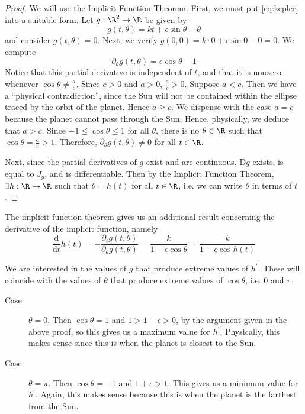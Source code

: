 \documentclass[letterpaper,11pt]{article}
\newcommand{\D}{\mathrm{D}}
\renewcommand{\d}[2]{\frac{\mathrm{d}#1}{\mathrm{d}#2}}
\newcommand{\dd}[1]{\d{}{#1}}
\begin{document}
\begin{proof}
  We will use the Implicit Function Theorem. First, we must put
  \eqref{eq:kepler} into a suitable form. Let $g : \R^2 \to \R$ be given by
  \begin{equation*}
    g(t, \theta) = kt + \epsilon \sin \theta - \theta
  \end{equation*}
  and consider $g(t, \theta) = 0$.
  Next, we verify $g(0, 0) = k \cdot 0 + \epsilon \sin 0 - 0 = 0$.
  We compute
  \begin{equation*}
    \partial_\theta g(t, \theta) = \epsilon \cos \theta - 1
  \end{equation*}
  Notice that this partial derivative is independent of $t$, and that it is
  nonzero whenever $\cos \theta \neq \frac{a}{c}$. Since $c > 0$ and $a > 0$,
  $\frac{a}{c} > 0$. Suppose $a < c$. Then we have a ``physical
  contradiction'', since the Sun will not be contained within the ellipse
  traced by the orbit of the planet. Hence $a \geq c$. We dispense with the
  case $a = c$ because the planet cannot pass through the Sun. Hence,
  physically, we deduce that $a > c$. Since $-1 \leq \cos \theta \leq 1$ for
  all $\theta$, there is no $\theta \in \R$ such that
  $\cos \theta = \frac{a}{c} > 1$. Therefore,
  $\partial_\theta g(t, \theta) \neq 0$ for all $t \in \R$.

  Next, since the partial derivatives of $g$ exist and are continuous, $\D g$
  exists, is equal to $J_g$, and is differentiable. Then by the Implicit
  Function Theorem, $\exists h : \R \to \R$ such that $\theta = h(t)$ for all
  $t \in \R$, i.e. we can write $\theta$ in terms of $t$.
\end{proof}

The implicit function theorem gives us an additional result concerning the
derivative of the implicit function, namely
\begin{equation*}
  \dd{t} h(t)
  = - \frac{\partial_t g(t, \theta)}{\partial_\theta g(t, \theta)}
  = \frac{k}{1 - \epsilon \cos \theta}
  = \frac{k}{1 - \epsilon \cos {h(t)}}
\end{equation*}

We are interested in the values of $g$ that produce extreme values of
$h^\prime$. These will coincide with the values of $\theta$ that produce
extreme values of $\cos \theta$, i.e. $0$ and $\pi$.

\begin{description}
  \item[Case] $\theta = 0$. Then $\cos \theta = 1$ and $1 > 1 - \epsilon > 0$,
    by the argument given in the above proof, so this gives us a maximum value
    for $h^\prime$. Physically, this makes sense since this is when the planet
    is closest to the Sun.

  \item[Case] $\theta = \pi$. Then $\cos \theta = -1$ and $1 + \epsilon > 1$.
    This gives us a minimum value for $h^\prime$. Again, this makes sense
    because this is when the planet is the farthest from the Sun.
\end{description}
\end{document}
